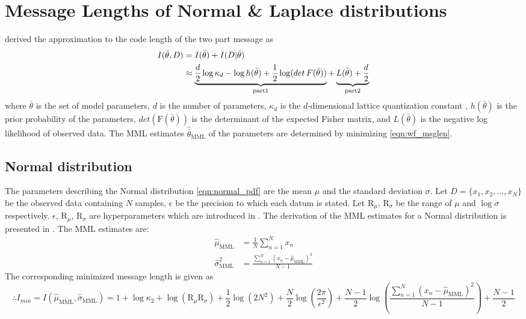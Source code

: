 \documentclass[wcp]{jmlr}
\begin{document}
\section{Message Lengths of Normal \& Laplace distributions}
\citet{wallace-87} derived the approximation to the code length of the two part message as
\begin{align}
I(\bar{\theta},D) &= I(\bar{\theta}) + I(D|\bar{\theta}) \notag\\
&\approx \underbrace{\frac{d}{2}\log\kappa_d -\log h(\bar{\theta}) + \frac{1}{2}\log(det\,F(\bar{\theta}))}_{\mathrm{part 1}} + \underbrace{L(\bar{\theta}) + \frac{d}{2}}_{\mathrm{part 2}} \label{eqn:wf_msglen}
\end{align}
where $\bar{\theta}$ is the set of model parameters, $d$ is the number of parameters, 
$\kappa_d$ is the $d$-dimensional lattice quantization constant \citep{conwaySloane84}, 
$h(\bar{\theta})$ is the prior probability of the parameters, 
$det(\mathrm{F}(\bar{\theta}))$ is the determinant of the expected Fisher matrix, and
$L(\bar{\theta})$ is the negative log likelihood of observed data. The MML estimates 
$\hat{\bar{\theta}}_{\mathrm{MML}}$ of the parameters are determined by minimizing 
\eqref{eqn:wf_msglen}. 

\subsection{Normal distribution}
The parameters describing the Normal distribution \eqref{eqn:normal_pdf} are the mean $\mu$
and the standard deviation $\sigma$. Let $D = \{x_1,x_2,\ldots,x_N\}$ be the observed data 
containing $N$ samples, $\epsilon$ be the precision to which each datum is stated. 
Let $\mathrm{R}_{\mu}$, $\mathrm{R}_{\sigma}$ be the range of $\mu$ and $\log\sigma$ 
respectively. $\epsilon$, $\mathrm{R}_{\mu}$, $\mathrm{R}_{\sigma}$ are hyperparameters
which are introduced in \citet{WallaceBook}. The derivation of the MML estimates 
for a Normal distribution is presented in \citet{WallaceBook,wallace68}. The MML estimates are:
\begin{align*}
\hat{\mu}_{\mathrm{MML}} &= \frac{1}{N} \sum_{n=1}^N x_n \\
\hat{\sigma}_{\mathrm{MML}}^2 &= \frac{\sum_{n=1}^N (x_n-\hat{\mu}_{\mathrm{MML}})^2}{N-1}
\end{align*}
The corresponding minimized message length is given as
\begin{dmath}
 \therefore I_{min} = I(\hat{\mu}_{\mathrm{MML}},\hat{\sigma}_{\mathrm{MML}}) = 1 + \log\kappa_2 + \log(\mathrm{R}_{\mu}\mathrm{R}_{\sigma}) + \frac{1}{2}\log(2N^2) + \frac{N}{2}\log\left(\frac{2\pi}{\epsilon^2}\right) + \frac{N-1}{2}\log\left(\frac{\sum_{n=1}^N (x_n-\hat{\mu}_{\mathrm{MML}})^2}{N-1}\right) + \frac{N-1}{2}  \label{eqn:normal_mml_estimate}
\end{dmath} 
\end{document}
